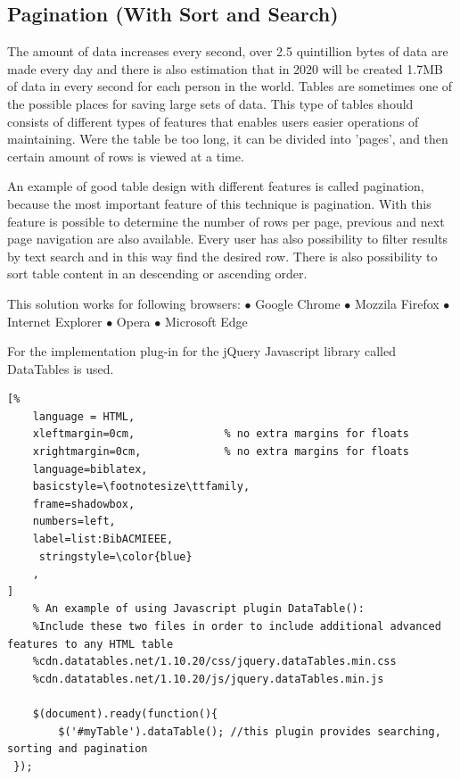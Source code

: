 \subsection{Pagination (With Sort and Search)}
The amount of data increases every second, over 2.5 quintillion bytes of data are made every day and there is also estimation
 that in 2020 will be created 1.7MB of data in every second for each person in the world\parencite{PG_2}.
\newline
Tables are sometimes one of the possible places for saving large sets of data.
This type of tables should consists of different types of features that enables users easier operations of maintaining.
\newline
Were the table be too long, it can be divided into 'pages', and then certain amount of rows is viewed at a time.
\newline

An example of good table design with different features is called pagination, because the most important feature of this technique is pagination.
With this feature is possible to determine the number of rows per page, previous  and next page navigation are also available.
Every user has also possibility to filter results by text search and in this way find the desired row.
There is also possibility to sort table content in an descending or ascending order.

This solution works for following browsers:
\newline $\bullet$ Google Chrome
\newline $\bullet$ Mozzila Firefox
\newline $\bullet$ Internet Explorer
\newline $\bullet$ Opera
\newline $\bullet$ Microsoft Edge

For the implementation plug-in for the jQuery Javascript library called DataTables is used\parencite{PG_1}.


\begin{lstlisting}[%
    language = HTML,
    xleftmargin=0cm,              % no extra margins for floats
    xrightmargin=0cm,             % no extra margins for floats
    language=biblatex,
    basicstyle=\footnotesize\ttfamily,
    frame=shadowbox,
    numbers=left,
    label=list:BibACMIEEE,
     stringstyle=\color{blue}
    ,
]
    % An example of using Javascript plugin DataTable():
    %Include these two files in order to include additional advanced features to any HTML table
    %cdn.datatables.net/1.10.20/css/jquery.dataTables.min.css
    %cdn.datatables.net/1.10.20/js/jquery.dataTables.min.js

    $(document).ready(function(){
        $('#myTable').dataTable(); //this plugin provides searching, sorting and pagination
 });

\end{lstlisting}

